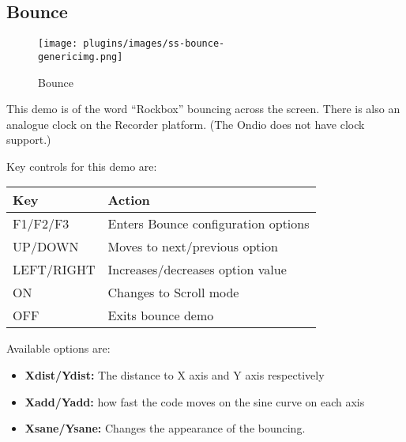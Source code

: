 \subsection{Bounce}
\begin{figure}[h]
\begin{center}
\texttt{[image: plugins/images/ss-bounce-\\genericimg.png]}
\end{center}
\caption{Bounce}
\end{figure}

This demo is of the word ``Rockbox'' bouncing across the screen.  There
is also an analogue clock on the Recorder platform.  (The Ondio does
not have clock support.)

Key controls for this demo are:

\begin{table}[h!]
\begin{center}
\begin{tabular}{@{}ll@{}}\toprule
\textbf{Key} & \textbf{Action} \\\midrule
F1/F2/F3 & Enters Bounce configuration options \\
UP/DOWN & Moves to next/previous option \\
LEFT/RIGHT & Increases/decreases option value \\
ON & Changes to Scroll mode \\
OFF & Exits bounce demo\\\bottomrule
\end{tabular}
\end{center}
\end{table}
Available options are:

\begin{itemize}
\item \textbf{Xdist/Ydist:} The distance to X axis and Y axis
respectively
\item \textbf{Xadd/Yadd:} how fast the code moves on the sine curve on
each axis
\item \textbf{Xsane/Ysane:} Changes the appearance of the bouncing.
\end{itemize}